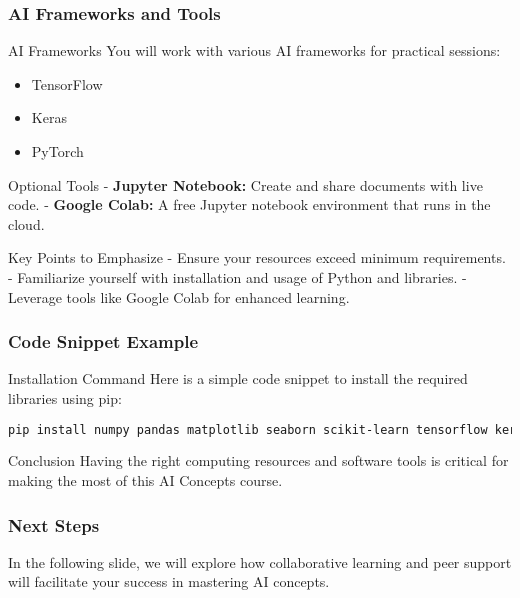\documentclass[aspectratio=169]{beamer}
\begin{document}
\begin{frame}[fragile]
    \frametitle{AI Frameworks and Tools}
    \begin{block}{AI Frameworks}
        You will work with various AI frameworks for practical sessions:
        \begin{itemize}
            \item TensorFlow
            \item Keras
            \item PyTorch
        \end{itemize}
    \end{block}

    \begin{block}{Optional Tools}
        - \textbf{Jupyter Notebook:} Create and share documents with live code.
        - \textbf{Google Colab:} A free Jupyter notebook environment that runs in the cloud.
    \end{block}

    \begin{block}{Key Points to Emphasize}
        - Ensure your resources exceed minimum requirements.
        - Familiarize yourself with installation and usage of Python and libraries.
        - Leverage tools like Google Colab for enhanced learning.
    \end{block}
\end{frame}

\begin{frame}[fragile]
    \frametitle{Code Snippet Example}
    \begin{block}{Installation Command}
        Here is a simple code snippet to install the required libraries using pip:
        \begin{lstlisting}[language=bash]
pip install numpy pandas matplotlib seaborn scikit-learn tensorflow keras torch
        \end{lstlisting}
    \end{block}

    \begin{block}{Conclusion}
        Having the right computing resources and software tools is critical for making the most of this AI Concepts course.
    \end{block}
\end{frame}

\begin{frame}[fragile]
    \frametitle{Next Steps}
    In the following slide, we will explore how collaborative learning and peer support will facilitate your success in mastering AI concepts.
\end{frame}
\end{document}
